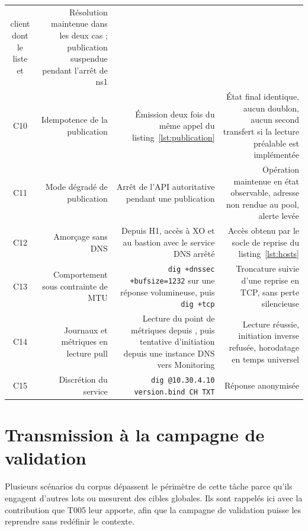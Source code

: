\begin{longtable}{@{}C{0.09}R{0.19}R{0.37}R{0.35}@{}}
  client dont le  liste  et  &
  Résolution maintenue dans les deux cas ; publication suspendue pendant
  l'arrêt de ns1\\
C10 & Idempotence de la publication &
  Émission deux fois du même appel du listing~\ref{lst:publication} &
  État final identique, aucun doublon, aucun second transfert si la lecture
  préalable est implémentée\\
C11 & Mode dégradé de publication &
  Arrêt de l'API autoritative pendant une publication &
  Opération maintenue en état observable, adresse non rendue au pool, alerte
  levée\\
C12 & Amorçage sans DNS &
  Depuis H1, accès à XO et au bastion avec le service DNS arrêté &
  Accès obtenu par le socle de reprise du listing~\ref{lst:hosts}\\
C13 & Comportement sous contrainte de MTU &
  \texttt{dig +dnssec +bufsize=1232} sur une réponse volumineuse, puis
  \texttt{dig +tcp} &
  Troncature suivie d'une reprise en TCP, sans perte silencieuse\\
C14 & Journaux et métriques en lecture pull &
  Lecture du point de métriques depuis , puis tentative
  d'initiation depuis une instance DNS vers Monitoring &
  Lecture réussie, initiation inverse refusée, horodatage en temps universel\\
C15 & Discrétion du service &
  \texttt{dig @10.30.4.10 version.bind CH TXT} & Réponse anonymisée\\
\end{longtable}

\section{Transmission à la campagne de validation}

Plusieurs scénarios du corpus dépassent le périmètre de cette tâche parce qu'ils
engagent d'autres lots ou mesurent des cibles globales. Ils sont rappelés ici
avec la contribution que T005 leur apporte, afin que la campagne de validation
puisse les reprendre sans redéfinir le contexte.

